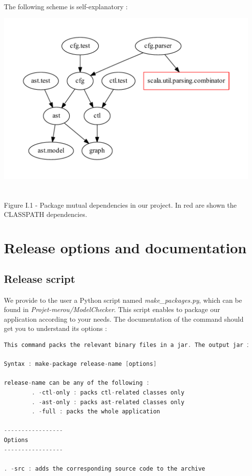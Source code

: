 \documentclass{report}
\begin{document}
\paragraph{}
\hspace{4mm}The following scheme is self-explanatory :

\begin{center}
\includegraphics[scale=0.65]{data/dependencies}
~\\~\\Figure I.1 - Package mutual dependencies in our project. In red are shown the CLASSPATH dependencies.
\end{center}

\section{Release options and documentation}

\subsection{Release script}

\paragraph{}
\hspace{4mm}We provide to the user a Python script named \textit{make\_packages.py}, which can be found in \textit{Projet-merou/ModelChecker}.
This script enables to package our application according to your needs. The documentation of the command should get you to understand its options :

\begin{lstlisting}[language=c++
]
This command packs the relevant binary files in a jar. The output jar is stored in the release folder.

Syntax : make-package release-name [options]

release-name can be any of the following :
        . -ctl-only : packs ctl-related classes only
        . -ast-only : packs ast-related classes only
        . -full : packs the whole application

-----------------
Options
-----------------

. -src : adds the corresponding source code to the archive
\end{lstlisting}
\end{document}
